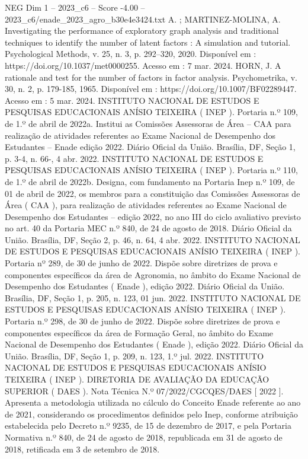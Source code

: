\begin{textsample}{NEG Dim 1 – 2023\_c6 – Score -4.00 – 2023\_c6/enade\_2023\_agro\_b30e4e3424.txt}
A. ; MARTINEZ-MOLINA, A.
Investigating the performance of exploratory graph analysis and traditional techniques to identify the number of latent factors : A simulation and tutorial.
Psychological Methods, v. 25, n. 3, p. 292–320, 2020.
Disponível em : https://doi.org/10.1037/met0000255.
Acesso em : 7 mar. 2024.
HORN, J.
A rationale and test for the number of factors in factor analysis.
Psychometrika, v. 30, n. 2, p. 179-185, 1965.
Disponível em : https://doi.org/10.1007/BF02289447.
Acesso em : 5 mar. 2024.
INSTITUTO NACIONAL DE ESTUDOS E PESQUISAS EDUCACIONAIS ANÍSIO TEIXEIRA ( INEP ).
Portaria n.º 109, de 1.º de abril de 2022a.
Institui as Comissões Assessoras de Área – CAA para realização de atividades referentes ao Exame Nacional de Desempenho dos Estudantes – Enade edição 2022.
Diário Oficial da União.
Brasília, DF, Seção 1, p. 3-4, n. 66-, 4 abr. 2022.
INSTITUTO NACIONAL DE ESTUDOS E PESQUISAS EDUCACIONAIS ANÍSIO TEIXEIRA ( INEP ).
Portaria n.º 110, de 1.º de abril de 2022b.
Designa, com fundamento na Portaria Inep n.º 109, de 01 de abril de 2022, os membros para a constituição das Comissões Assessoras de Área ( CAA ), para realização de atividades referentes ao Exame Nacional de Desempenho dos Estudantes – edição 2022, no ano III do ciclo avaliativo previsto no art. 40 da Portaria MEC n.º 840, de 24 de agosto de 2018.
Diário Oficial da União.
Brasília, DF, Seção 2, p. 46, n. 64, 4 abr. 2022.
INSTITUTO NACIONAL DE ESTUDOS E PESQUISAS EDUCACIONAIS ANÍSIO TEIXEIRA ( INEP ).
Portaria nº 289, de 30 de junho de 2022.
Dispõe sobre diretrizes de prova e componentes específicos da área de Agronomia, no âmbito do Exame Nacional de Desempenho dos Estudantes ( Enade ), edição 2022.
Diário Oficial da União.
Brasília, DF, Seção 1, p. 205, n. 123, 01 jun. 2022.
INSTITUTO NACIONAL DE ESTUDOS E PESQUISAS EDUCACIONAIS ANÍSIO TEIXEIRA ( INEP ).
Portaria n.º 298, de 30 de junho de 2022.
Dispõe sobre diretrizes de prova e componentes específicos da área de Formação Geral, no âmbito do Exame Nacional de Desempenho dos Estudantes ( Enade ), edição 2022.
Diário Oficial da União.
Brasília, DF, Seção 1, p. 209, n. 123, 1.º jul. 2022.
INSTITUTO NACIONAL DE ESTUDOS E PESQUISAS EDUCACIONAIS ANÍSIO TEIXEIRA ( INEP ).
DIRETORIA DE AVALIAÇÃO DA EDUCAÇÃO SUPERIOR ( DAES ).
Nota Técnica N.º 07/2022/CGCQES/DAES [ 2022 ].
Apresenta a metodologia utilizada no cálculo do Conceito Enade referente ao ano de 2021, considerando os procedimentos definidos pelo Inep, conforme atribuição estabelecida pelo Decreto n.º 9235, de 15 de dezembro de 2017, e pela Portaria Normativa n.º 840, de 24 de agosto de 2018, republicada em 31 de agosto de 2018, retificada em 3 de setembro de 2018.

\end{textsample}
